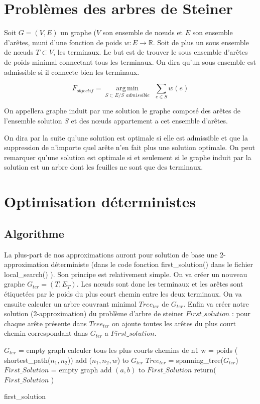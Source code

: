 \documentclass[10pt,a4paper]{article}
\DeclareMathOperator*{\argmin}{arg\,min}
\begin{document}
\section{Problèmes des arbres de Steiner}

Soit $G = (V,E)$ un graphe ($V$ son ensemble de nœuds et $E$ son ensemble d'arêtes, muni d'une fonction de poids $w:E\rightarrow \mathbb{R}$. Soit de plus un sous ensemble de nœuds $T \subset V$, les terminaux. Le but est de trouver le sous ensemble d'arêtes de poids minimal connectant tous les terminaux. On dira qu'un sous ensemble est admissible si il connecte bien les terminaux.  

$$F_{objectif} = \argmin\limits_{S\subset E / S ~~admissible} ~~ \sum\limits_{e\in S} w(e) $$

On appellera graphe induit par une solution le graphe composé des arêtes de l'ensemble solution $S$ et des nœuds appartement a cet ensemble d'arêtes. 

On dira par la suite qu'une solution est optimale si elle est admissible et que la suppression de n'importe quel arête n'en fait plus une solution optimale. On peut remarquer qu'une solution est optimale si et seulement si le graphe induit par la solution est un arbre dont les feuilles ne sont que des terminaux. 

\section{Optimisation déterministes}

\subsection{Algorithme}
La plus-part de nos approximations auront pour solution de base une 2-approximation déterministe (dans le code fonction first\_solution() dans le fichier local\_search() ).
Son principe est relativement simple. On va créer un nouveau graphe $G_{ter} = (T, E_T)$. Les nœuds sont donc les terminaux et les arêtes sont étiquetées par le poids du plus court chemin entre les deux terminaux. On va ensuite calculer un arbre couvrant minimal $Tree_{ter}$ de $G_{ter}$. Enfin va créer notre solution (2-approximation) du problème d'arbre de steiner $First\_solution$ :  pour chaque arête présente dans $Tree_{ter}$ on ajoute toutes les arêtes du plus court chemin correspondant dans $G_{ter} $ a $First\_solution$. 



\begin{algorithm}[]
\SetAlgoLined
{}
$G_{ter}$ = empty graph\;
{
	calculer tous les plus courts chemins de n1\;
	{
		w = poids ( shortest\_path($n_1,n_2$))\;
		add  ($n_1,n_2,w $) to $G_{ter}$ \; 
	}
}
$Tree_{ter}$ = spanning\_tree($G_{ter}$)\;
$First\_Solution$ = empty graph\;
{
	{
		add $(a,b)$ to $First\_Solution$ \;
	}
}
return($First\_Solution$ )\;
\caption{first\_solution}
\end{algorithm}
\end{document}
